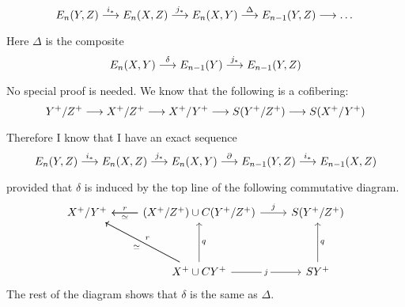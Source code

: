 \documentclass[../main]{subfiles}
\begin{document}
\[E_n(Y, Z)\vra{i_\ast} E_n(X, Z) \vra{j_\ast} E_n(X, Y) \vra{\Delta} E_{n-1}(Y, Z) \lra \dots\]
Here $\Delta$ is the composite
\[E_n(X,Y) \vra{\delta} E_{n-1}(Y)\vra{j_\ast} E_{n-1}(Y, Z)\]
No special proof is needed. We know that the following is a cofibering:
\[Y^+/Z^+ \vra{} X^+/Z^+\vra{}X^+/Y^+ \vra{} S(Y^+/Z^+) \vra{} S(X^+/Y^+)\]
Therefore I know that I have an exact sequence
\[E_n(Y,Z) \vra{i_\ast} E_n(X, Z)\vra{j_\ast}E_n(X, Y) \vra{\partial} E_{n-1}(Y, Z) \vra{i_\ast} E_{n-1}(X, Z)\]
provided that $\delta$ is induced by the top line of the following commutative diagram.
\[\begin{tikzcd}
	{X^+/Y^+} & {(X^+/Z^+)\cup C(Y^+/Z^+)} & {S(Y^+/Z^+)} \\
	\\
	& {X^+\cup CY^+} & {SY^+}
	\arrow["j", from=1-2, to=1-3]
	\arrow["r"', from=1-2, to=1-1]
	\arrow["\simeq", from=1-2, to=1-1]
	\arrow["q"', from=3-2, to=1-2]
	\arrow["\simeq", from=3-2, to=1-1]
	\arrow["j"{description}, from=3-2, to=3-3]
	\arrow["q"', from=3-3, to=1-3]
	\arrow["r"', from=3-2, to=1-1]
\end{tikzcd}\]
The rest of the diagram shows that $\delta$ is the same as $\Delta$.
\end{document}
